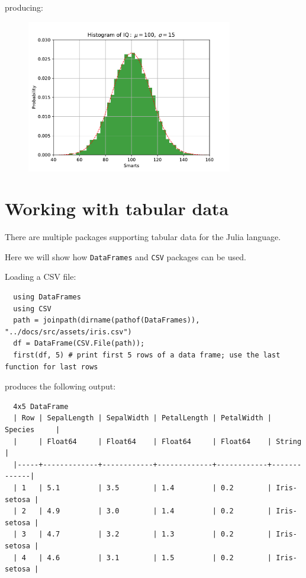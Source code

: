 \documentclass[10pt,a4paper]{article}
\begin{document}
producing:
\begin{figure}[h]
\centering
\includegraphics[width=9cm]{hist.pdf}
\end{figure}

\section{Working with tabular data}

There are multiple packages supporting tabular data for the Julia language.

Here we will show how \lstinline|DataFrames| and \lstinline|CSV| packages can be used.

Loading a CSV file:
\begin{lstlisting}
  using DataFrames
  using CSV
  path = joinpath(dirname(pathof(DataFrames)), "../docs/src/assets/iris.csv")
  df = DataFrame(CSV.File(path));
  first(df, 5) # print first 5 rows of a data frame; use the last function for last rows
\end{lstlisting}

produces the following output:
\begin{lstlisting}
  4x5 DataFrame
  | Row | SepalLength | SepalWidth | PetalLength | PetalWidth | Species     |
  |     | Float64     | Float64    | Float64     | Float64    | String      |
  |-----+-------------+------------+-------------+------------+-------------|
  | 1   | 5.1         | 3.5        | 1.4         | 0.2        | Iris-setosa |
  | 2   | 4.9         | 3.0        | 1.4         | 0.2        | Iris-setosa |
  | 3   | 4.7         | 3.2        | 1.3         | 0.2        | Iris-setosa |
  | 4   | 4.6         | 3.1        | 1.5         | 0.2        | Iris-setosa |
\end{lstlisting}
\end{document}
